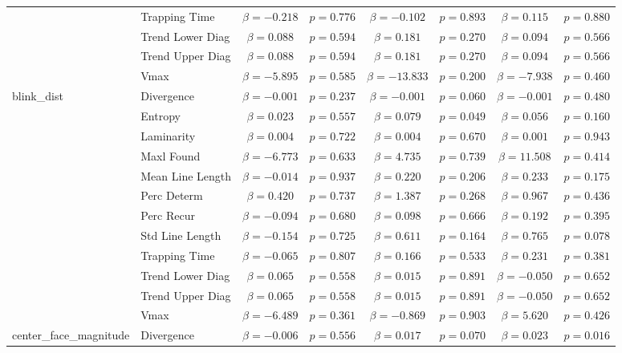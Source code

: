\begin{tabular}{llcc|cc|cc}
 & Trapping Time & $\beta = -0.218$ & $p = 0.776$ & $\beta = -0.102$ & $p = 0.893$ & $\beta = 0.115$ & $p = 0.880$ \\
 & Trend Lower Diag & $\beta = 0.088$ & $p = 0.594$ & $\beta = 0.181$ & $p = 0.270$ & $\beta = 0.094$ & $p = 0.566$ \\
 & Trend Upper Diag & $\beta = 0.088$ & $p = 0.594$ & $\beta = 0.181$ & $p = 0.270$ & $\beta = 0.094$ & $p = 0.566$ \\
 & Vmax & $\beta = -5.895$ & $p = 0.585$ & $\beta = -13.833$ & $p = 0.200$ & $\beta = -7.938$ & $p = 0.460$ \\
\midrule
\multirow{12}{*}{blink_dist} & Divergence & $\beta = -0.001$ & $p = 0.237$ & $\beta = -0.001$ & $p = 0.060$ & $\beta = -0.001$ & $p = 0.480$ \\
 & Entropy & $\beta = 0.023$ & $p = 0.557$ & $\beta = 0.079$ & $p = 0.049$ & $\beta = 0.056$ & $p = 0.160$ \\
 & Laminarity & $\beta = 0.004$ & $p = 0.722$ & $\beta = 0.004$ & $p = 0.670$ & $\beta = 0.001$ & $p = 0.943$ \\
 & Maxl Found & $\beta = -6.773$ & $p = 0.633$ & $\beta = 4.735$ & $p = 0.739$ & $\beta = 11.508$ & $p = 0.414$ \\
 & Mean Line Length & $\beta = -0.014$ & $p = 0.937$ & $\beta = 0.220$ & $p = 0.206$ & $\beta = 0.233$ & $p = 0.175$ \\
 & Perc Determ & $\beta = 0.420$ & $p = 0.737$ & $\beta = 1.387$ & $p = 0.268$ & $\beta = 0.967$ & $p = 0.436$ \\
 & Perc Recur & $\beta = -0.094$ & $p = 0.680$ & $\beta = 0.098$ & $p = 0.666$ & $\beta = 0.192$ & $p = 0.395$ \\
 & Std Line Length & $\beta = -0.154$ & $p = 0.725$ & $\beta = 0.611$ & $p = 0.164$ & $\beta = 0.765$ & $p = 0.078$ \\
 & Trapping Time & $\beta = -0.065$ & $p = 0.807$ & $\beta = 0.166$ & $p = 0.533$ & $\beta = 0.231$ & $p = 0.381$ \\
 & Trend Lower Diag & $\beta = 0.065$ & $p = 0.558$ & $\beta = 0.015$ & $p = 0.891$ & $\beta = -0.050$ & $p = 0.652$ \\
 & Trend Upper Diag & $\beta = 0.065$ & $p = 0.558$ & $\beta = 0.015$ & $p = 0.891$ & $\beta = -0.050$ & $p = 0.652$ \\
 & Vmax & $\beta = -6.489$ & $p = 0.361$ & $\beta = -0.869$ & $p = 0.903$ & $\beta = 5.620$ & $p = 0.426$ \\
\midrule
\multirow{12}{*}{center_face_magnitude} & Divergence & $\beta = -0.006$ & $p = 0.556$ & $\beta = 0.017$ & $p = 0.070$ & $\beta = 0.023$ & $p = 0.016$ \\

\end{tabular}

